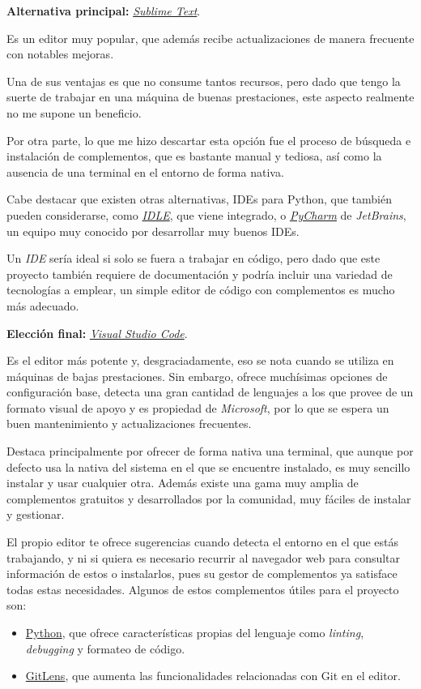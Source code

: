 \textbf{Alternativa principal:} \href{https://www.sublimetext.com/}{\textit{Sublime Text}}.

Es un editor muy popular, que además recibe actualizaciones de manera frecuente con notables mejoras.

Una de sus ventajas es que no consume tantos recursos, pero dado que tengo la suerte de trabajar en una máquina de buenas prestaciones, este aspecto realmente no me supone un beneficio.

Por otra parte, lo que me hizo descartar esta opción fue el proceso de búsqueda e instalación de complementos, que es bastante manual y tediosa, así como la ausencia de una terminal en el entorno de forma nativa.

Cabe destacar que existen otras alternativas, IDEs para Python, que también pueden considerarse, como \href{https://docs.python.org/3/library/idle.html}{\textit{IDLE}}, que viene integrado, o \href{https://www.jetbrains.com/es-es/pycharm/}{\textit{PyCharm}} de \textit{JetBrains}, un equipo muy conocido por desarrollar muy buenos IDEs.

Un \textit{IDE} sería ideal si solo se fuera a trabajar en código, pero dado que este proyecto también requiere de documentación y podría incluir una variedad de tecnologías a emplear, un simple editor de código con complementos es mucho más adecuado.

\textbf{Elección final:} \href{https://code.visualstudio.com/}{\textit{Visual Studio Code}}.

Es el editor más potente y, desgraciadamente, eso se nota cuando se utiliza en máquinas de bajas prestaciones. Sin embargo, ofrece muchísimas opciones de configuración base, detecta una gran cantidad de lenguajes a los que provee de un formato visual de apoyo y es propiedad de \textit{Microsoft}, por lo que se espera un buen mantenimiento y actualizaciones frecuentes.

Destaca principalmente por ofrecer de forma nativa una terminal, que aunque por defecto usa la nativa del sistema en el que se encuentre instalado, es muy sencillo instalar y usar cualquier otra. Además existe una gama muy amplia de complementos gratuitos y desarrollados por la comunidad, muy fáciles de instalar y gestionar. 

El propio editor te ofrece sugerencias cuando detecta el entorno en el que estás trabajando, y ni si quiera es necesario recurrir al navegador web para consultar información de estos o instalarlos, pues su gestor de complementos ya satisface todas estas necesidades. Algunos de estos complementos útiles para el proyecto son:
\begin{itemize}
    \item \href{https://marketplace.visualstudio.com/items?itemName=ms-python.python}{Python}, que ofrece características propias del lenguaje como \textit{linting}, \textit{debugging} y formateo de código.
    \item \href{https://marketplace.visualstudio.com/items?itemName=eamodio.gitlens}{GitLens}, que aumenta las funcionalidades relacionadas con Git en el editor.
\end{itemize}

